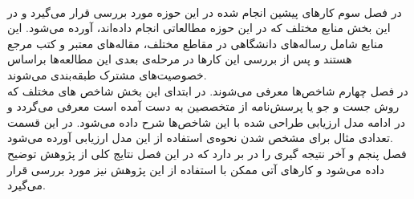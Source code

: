 \\ 
در فصل سوم کارهای پیشین انجام شده در این حوزه مورد بررسی قرار می‌گیرد و در این بخش  منابع مختلف که در این حوزه مطالعاتی انجام داده‌اند، آورده می‌شود. این منابع شامل رساله‌های دانشگاهی در مقاطع مختلف، مقاله‌های معتبر و کتب مرجع هستند و پس از  بررسی این کارها در مرحله‌ی بعدی این مطالعه‌ها براساس خصوصیت‌های مشترک طبقه‌بندی می‌شوند.
\\
در فصل چهارم شاخص‌ها معرفی می‌شوند. در ابتدای این بخش شاخص های مختلف که روش جست و جو یا پرسش‌نامه از متخصصین به دست آمده است معرفی می‌گردد و در ادامه مدل ارزیابی طراحی شده با این شاخص‌ها شرح داده می‌شود. در این قسمت تعدادی مثال برای مشخص شدن نحوه‌ی استفاده از این مدل ارزیابی آورده می‌شود.
\\
فصل پنجم و آخر نتیجه گیری را در بر دارد که در این فصل نتایج کلی از پژوهش توضیح داده می‌شود و کارهای آتی ممکن با استفاده از این پژوهش نیز مورد بررسی قرار می‌گیرد. 